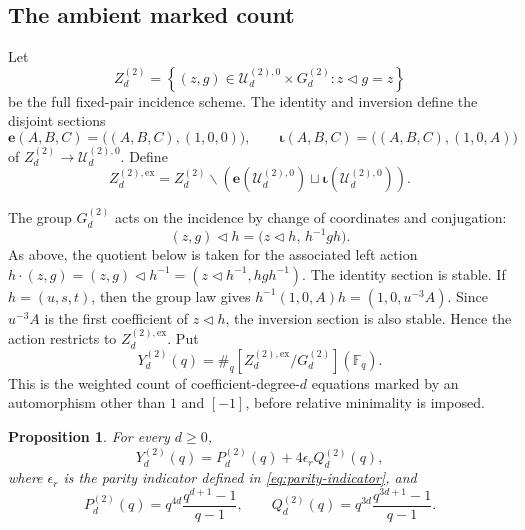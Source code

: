 \documentclass[a4paper,12pt]{amsart}
\newtheorem{prop}[thm]{Proposition}
\theoremstyle{definition}
\newcommand{\cU}{\mathcal{U}}
\newcommand{\Fb}{\mathbb{F}}
\renewcommand{\setminus}{\smallsetminus}
\begin{document}
\subsection{The ambient marked count}

Let
\[
Z_d^{(2)}
=
\left\{(z,g)\in\cU_d^{(2),0}\times G_d^{(2)}:z\mathbin{\triangleleft}g=z\right\}
\]
be the full fixed-pair incidence scheme.  The identity and inversion define the disjoint sections
\[
\mathbf e(A,B,C)=\bigl((A,B,C),(1,0,0)\bigr),
\qquad
\boldsymbol\iota(A,B,C)=\bigl((A,B,C),(1,0,A)\bigr)
\]
of $Z_d^{(2)}\to\cU_d^{(2),0}$.  Define
\[
Z_d^{(2),\mathrm{ex}}
=
Z_d^{(2)}\setminus
\left(\mathbf e(\cU_d^{(2),0})\sqcup\boldsymbol\iota(\cU_d^{(2),0})\right).
\]

The group $G_d^{(2)}$ acts on the incidence by change of coordinates and conjugation:
\[
(z,g)\mathbin{\triangleleft}h
=
\bigl(z\mathbin{\triangleleft}h,\,h^{-1}gh\bigr).
\]
As above, the quotient below is taken for the associated left action $h\cdot(z,g)=(z,g)\mathbin{\triangleleft}h^{-1}=(z\mathbin{\triangleleft}h^{-1},hgh^{-1})$.  The identity section is stable.  If $h=(u,s,t)$, then the group law gives $h^{-1}(1,0,A)h=(1,0,u^{-3}A)$.  Since $u^{-3}A$ is the first coefficient of $z\mathbin{\triangleleft}h$, the inversion section is also stable.  Hence the action restricts to $Z_d^{(2),\mathrm{ex}}$.  Put
\[
Y_d^{(2)}(q)
=
\#_q[Z_d^{(2),\mathrm{ex}}/G_d^{(2)}](\Fb_q).
\]
This is the weighted count of coefficient-degree-$d$ equations marked by an automorphism other than $1$ and $[-1]$, before relative minimality is imposed.

\begin{prop}
\label{prop:char2-ambient-mass}
For every $d\geq0$,
\begin{equation}\label{eq:char2-ambient-mass}
Y_d^{(2)}(q)
=
P_d^{(2)}(q)+4\epsilon_rQ_d^{(2)}(q),
\end{equation}
where $\epsilon_r$ is the parity indicator defined in \eqref{eq:parity-indicator}, and
\begin{equation}\label{eq:char2-PQ}
P_d^{(2)}(q)
=
q^{4d}\frac{q^{d+1}-1}{q-1},
\qquad
Q_d^{(2)}(q)
=
q^{3d}\frac{q^{3d+1}-1}{q-1}.
\end{equation}
\end{prop}
\end{document}
